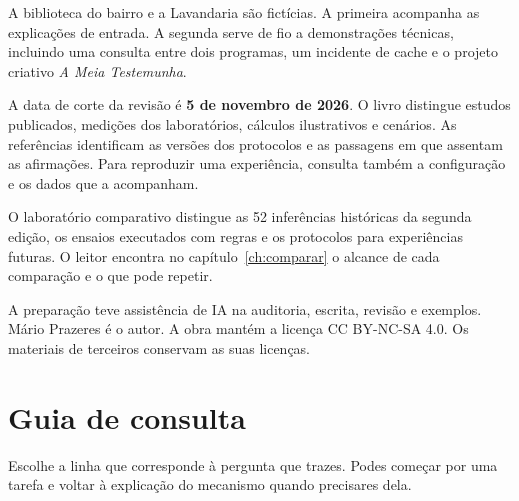 A biblioteca do bairro e a Lavandaria são fictícias. A primeira acompanha as explicações de entrada. A segunda serve de fio a demonstrações técnicas, incluindo uma consulta entre dois programas, um incidente de cache e o projeto criativo \emph{A Meia Testemunha}.

A data de corte da revisão é \textbf{5 de novembro de 2026}. O livro distingue estudos publicados, medições dos laboratórios, cálculos ilustrativos e cenários. As referências identificam as versões dos protocolos e as passagens em que assentam as afirmações. Para reproduzir uma experiência, consulta também a configuração e os dados que a acompanham.

O laboratório comparativo distingue as 52 inferências históricas da segunda edição, os ensaios executados com regras e os protocolos para experiências futuras. O leitor encontra no capítulo~\ref{ch:comparar} o alcance de cada comparação e o que pode repetir.

A preparação teve assistência de IA na auditoria, escrita, revisão e exemplos. Mário Prazeres é o autor. A obra mantém a licença CC BY-NC-SA 4.0. Os materiais de terceiros conservam as suas licenças.
\chapter*{Guia de consulta}

Escolhe a linha que corresponde à pergunta que trazes. Podes começar por uma tarefa e voltar à explicação do mecanismo quando precisares dela.

